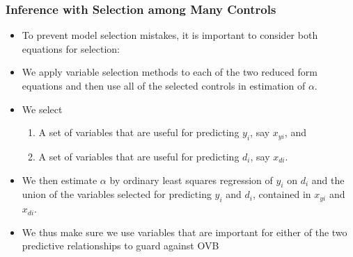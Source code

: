 \documentclass[
  shownotes,
  xcolor={svgnames},
  hyperref={colorlinks,citecolor=DarkBlue,linkcolor=DarkRed,urlcolor=DarkBlue}
  , aspectratio=169]{beamer}
\begin{document}
\begin{frame}[fragile]
\frametitle{Inference with Selection among Many Controls}

\begin{itemize}


\item To prevent model selection mistakes, it is important to consider both equations for selection: 
\medskip
\item We apply variable selection methods to each of the two reduced form equations and then use all of the selected controls in estimation of $\alpha$. 
\medskip
\item We select
\begin{enumerate}
\item A set of variables that are useful for predicting $y_i$, say $x_{yi}$, and 
\item A set of variables that are useful for predicting $d_i$, say $x_{di}$.

\end{enumerate}
\item We then estimate $\alpha$ by ordinary least squares regression of $y_i$ on $d_i$ and the union of the variables selected for predicting $y_i$ and $d_i$, contained in $x_{yi}$ and $x_{di}$. 

\item We thus make sure we use variables that are important for either of the two predictive relationships to guard against OVB

\end{itemize}



\end{frame}
\end{document}
